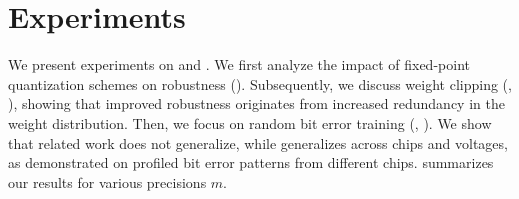 \section{Experiments}
\label{sec:experiments}

We present experiments on \MNIST \citep{LecunIEEE1998} and \Cifar \citep{Krizhevsky2009}. We first analyze the impact of fixed-point quantization schemes on robustness (). Subsequently, we discuss weight clipping (\Clipping, ), showing that improved robustness originates from increased redundancy in the weight distribution. Then, we focus on random bit error training (\Random, ). We show that related work \cite{KimDATE2018,KoppulaMICRO2019} does not generalize, while \Random generalizes across chips and voltages, as demonstrated on profiled bit error patterns from different chips.  summarizes our results for various precisions $m$.

